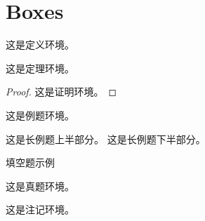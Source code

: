 \documentclass[a4paper,12pt,oneside]{maki-notes}
\begin{document}
\mainmatter

\chapter{Boxes}

\begin{definition}[定义测试]
这是定义环境。
\end{definition}

\begin{theorem}[定理测试]
这是定理环境。
\end{theorem}

\begin{proof}
这是证明环境。
\end{proof}

\begin{example}
这是例题环境。
\end{example}

\begin{longexample}
这是长例题上半部分。
\tcblower
这是长例题下半部分。
\end{longexample}

\begin{exercise}
填空题示例 \fillin[2cm]
\end{exercise}

\begin{realexam}[2026 模拟]
这是真题环境。
\end{realexam}

\begin{note}
这是注记环境。
\end{note}
\end{document}
